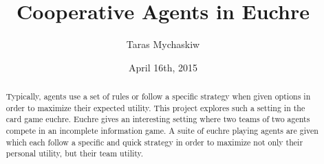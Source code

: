 \documentclass[12pt]{article}
\title{Cooperative Agents in Euchre}
\author{Taras Mychaskiw}
\date{April 16th, 2015}
\begin{document}
\maketitle

    \begin{abstract}
        Typically, agents use a set of rules or follow a specific strategy when given options in order to maximize their expected utility.
        This project explores such a setting in the card game euchre. Euchre gives an interesting setting where two teams of two agents
        compete in an incomplete information game. A suite of euchre playing agents are given which each follow a specific
        and quick strategy in order to maximize not only their personal utility, but their team utility.
    \end{abstract}
    
    \thispagestyle{empty}
    \clearpage
    \thispagestyle{empty}
    \tableofcontents
    \clearpage
    \setcounter{page}{1}
    
    
    
    
    
    
    
    
    
    
    
    
    
\end{document}
